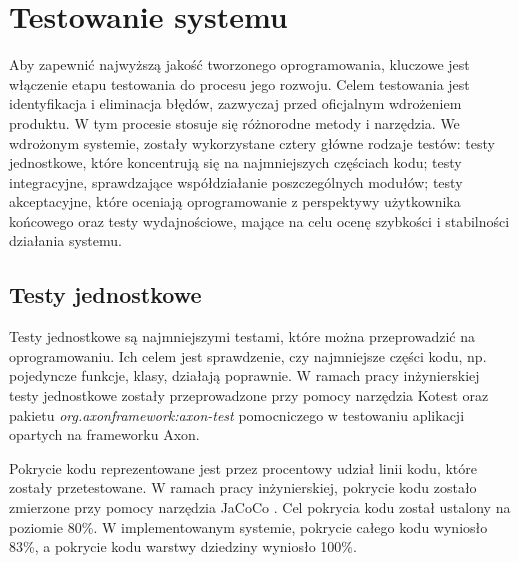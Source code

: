 \clearpage %

\section{Testowanie systemu}

Aby zapewnić najwyższą jakość tworzonego oprogramowania, kluczowe jest włączenie etapu testowania do procesu jego rozwoju. Celem testowania jest identyfikacja i eliminacja błędów, zazwyczaj przed oficjalnym wdrożeniem produktu. W tym procesie stosuje się różnorodne metody i narzędzia. We wdrożonym systemie, zostały wykorzystane cztery główne rodzaje testów: testy jednostkowe, które koncentrują się na najmniejszych częściach kodu; testy integracyjne, sprawdzające współdziałanie poszczególnych modułów; testy akceptacyjne, które oceniają oprogramowanie z perspektywy użytkownika końcowego oraz testy wydajnościowe, mające na celu ocenę szybkości i stabilności działania systemu.

\subsection{Testy jednostkowe}

Testy jednostkowe są najmniejszymi testami, które można przeprowadzić na oprogramowaniu. Ich celem jest sprawdzenie, czy najmniejsze części kodu, np. pojedyncze funkcje, klasy, działają poprawnie. W ramach pracy inżynierskiej testy jednostkowe zostały przeprowadzone przy pomocy narzędzia Kotest \cite{kotest} oraz pakietu \textit{org.axonframework:axon-test} pomocniczego w testowaniu aplikacji opartych na frameworku Axon.

Pokrycie kodu reprezentowane jest przez procentowy udział linii kodu, które zostały przetestowane. W ramach pracy inżynierskiej, pokrycie kodu zostało zmierzone przy pomocy narzędzia JaCoCo \cite{jacoco}. Cel pokrycia kodu został ustalony na poziomie 80\%. W implementowanym systemie, pokrycie całego kodu wyniosło 83\%, a pokrycie kodu warstwy dziedziny wyniosło 100\%.

